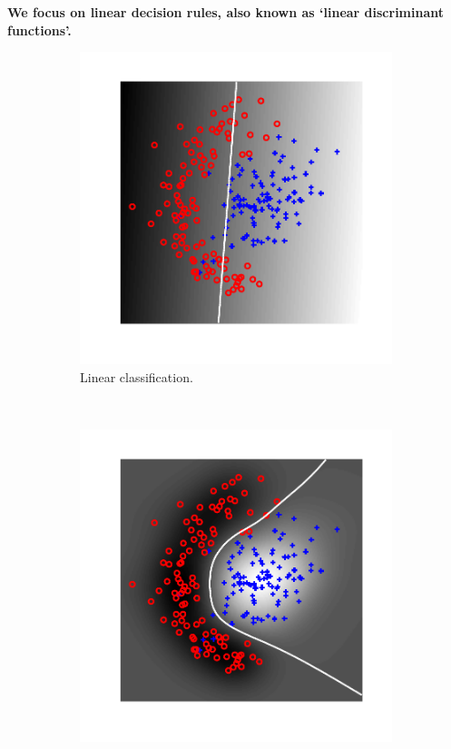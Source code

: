\textbf{We focus on linear decision rules, also known as `linear discriminant functions'.} 
\begin{figure}
	\centering
	\begin{subfigure}[b]{0.45\textwidth}
		\centering
		\includegraphics[width=\textwidth]{./lecture6/LinClassification.pdf}
		\caption{Linear classification.}
	\end{subfigure}
	~
	\begin{subfigure}[b]{0.45\textwidth}
		\centering
		\includegraphics[width=\textwidth]{./lecture6/NonLinClassification.pdf}

\end{subfigure}
\end{figure}
